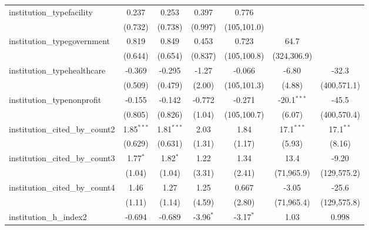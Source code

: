 \begin{tabular}{lcccccc}
   institution\_typefacility             & 0.237          & 0.253          & 0.397         & 0.776         &               &   \\   
                                         & (0.732)        & (0.738)        & (0.997)       & (105,101.0)   &               &   \\   
   institution\_typegovernment           & 0.819          & 0.849          & 0.453         & 0.723         & 64.7          &   \\   
                                         & (0.644)        & (0.654)        & (0.837)       & (105,100.8)   & (324,306.9)   &   \\   
   institution\_typehealthcare           & -0.369         & -0.295         & -1.27         & -0.066        & -6.80         & -32.3\\   
                                         & (0.509)        & (0.479)        & (2.00)        & (105,101.3)   & (4.88)        & (400,571.1)\\   
   institution\_typenonprofit            & -0.155         & -0.142         & -0.772        & -0.271        & -20.1$^{***}$ & -45.5\\   
                                         & (0.805)        & (0.826)        & (1.04)        & (105,100.7)   & (6.07)        & (400,570.4)\\   
   institution\_cited\_by\_count2        & 1.85$^{***}$   & 1.81$^{***}$   & 2.03          & 1.84          & 17.1$^{***}$  & 17.1$^{**}$\\   
                                         & (0.629)        & (0.631)        & (1.31)        & (1.17)        & (5.93)        & (8.16)\\   
   institution\_cited\_by\_count3        & 1.77$^{*}$     & 1.82$^{*}$     & 1.22          & 1.34          & 13.4          & -9.20\\   
                                         & (1.04)         & (1.04)         & (3.31)        & (2.41)        & (71,965.9)    & (129,575.2)\\   
   institution\_cited\_by\_count4        & 1.46           & 1.27           & 1.25          & 0.667         & -3.05         & -25.6\\   
                                         & (1.11)         & (1.14)         & (4.59)        & (2.80)        & (71,965.4)    & (129,575.8)\\   
   institution\_h\_index2                & -0.694         & -0.689         & -3.96$^{*}$   & -3.17$^{*}$   & 1.03          & 0.998\\   

\end{tabular}
